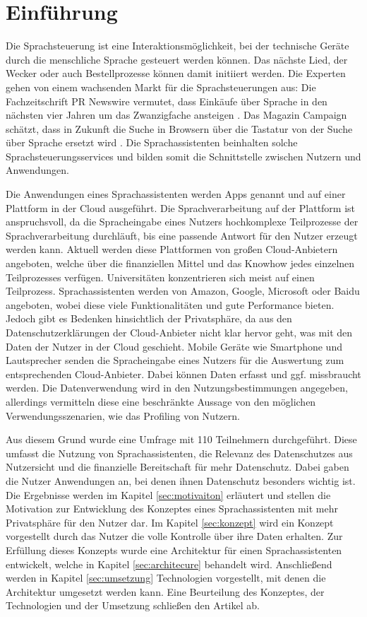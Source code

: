 \section{Einführung}
Die Sprachsteuerung ist eine Interaktionsmöglichkeit, bei der technische Geräte durch die menschliche Sprache gesteuert werden können. Das nächste Lied, der Wecker oder auch Bestellprozesse können damit initiiert werden.  Die Experten gehen von einem wachsenden Markt für die Sprachsteuerungen aus: Die Fachzeitschrift \glqq PR Newswire\grqq{} vermutet, dass Einkäufe über Sprache in den nächsten vier Jahren um das Zwanzigfache ansteigen \cite{prNewswire}. Das Magazin \glqq Campaign\grqq{} schätzt, dass in Zukunft die Suche in Browsern über die Tastatur von der Suche über Sprache ersetzt wird \cite{Campaign}. Die Sprachassistenten beinhalten solche Sprachsteuerungsservices und bilden somit die Schnittstelle zwischen Nutzern und Anwendungen. 

Die Anwendungen eines Sprachassistenten werden Apps genannt und auf einer Plattform in der Cloud ausgeführt. Die Sprachverarbeitung auf der Plattform ist anspruchsvoll, da die Spracheingabe eines Nutzers hochkomplexe Teilprozesse der Sprachverarbeitung durchläuft, bis eine passende Antwort für den Nutzer erzeugt werden kann. Aktuell werden diese Plattformen von großen Cloud-Anbietern angeboten, welche über die finanziellen Mittel und das Knowhow jedes einzelnen Teilprozesses verfügen. Universitäten konzentrieren sich meist auf einen Teilprozess. Sprachassistenten werden von Amazon, Google, Microsoft oder Baidu angeboten, wobei diese viele Funktionalitäten und gute Performance bieten. Jedoch gibt es Bedenken hinsichtlich der Privatsphäre, da aus den Datenschutzerklärungen der Cloud-Anbieter nicht klar hervor geht, was mit den Daten der Nutzer in der Cloud geschieht. Mobile Geräte wie Smartphone und Lautsprecher senden die Spracheingabe eines Nutzers für die Auswertung zum entsprechenden Cloud-Anbieter. Dabei können Daten erfasst und ggf. missbraucht werden. Die Datenverwendung wird in den Nutzungsbestimmungen angegeben, allerdings vermitteln diese eine beschränkte Aussage von den möglichen Verwendungsszenarien, wie das Profiling von Nutzern. 

Aus diesem Grund wurde eine Umfrage mit 110 Teilnehmern durchgeführt. Diese umfasst die Nutzung von Sprachassistenten, die Relevanz des Datenschutzes aus Nutzersicht und  die finanzielle Bereitschaft für mehr Datenschutz. Dabei gaben die Nutzer Anwendungen an, bei denen ihnen Datenschutz besonders wichtig ist. Die Ergebnisse werden im Kapitel \ref{sec:motivaiton} erläutert und stellen die Motivation zur Entwicklung des Konzeptes eines Sprachassistenten mit mehr Privatsphäre für den Nutzer dar. Im Kapitel \ref{sec:konzept} wird ein Konzept vorgestellt durch das Nutzer die volle Kontrolle über ihre Daten erhalten. Zur Erfüllung dieses Konzepts wurde eine Architektur für einen Sprachassistenten entwickelt, welche in Kapitel \ref{sec:architecure} behandelt wird. Anschließend werden in Kapitel \ref{sec:umsetzung} Technologien vorgestellt, mit denen die Architektur umgesetzt werden kann. Eine Beurteilung des Konzeptes, der Technologien und der Umsetzung schließen den Artikel ab. \newline



